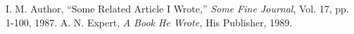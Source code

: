 \begin{thebibliography}{9}
I. M. Author,
``Some Related Article I Wrote,''
{\em Some Fine Journal}, Vol. 17, pp. 1-100, 1987.
A. N. Expert,
{\em A Book He Wrote,}
His Publisher, 1989.
\end{thebibliography}

